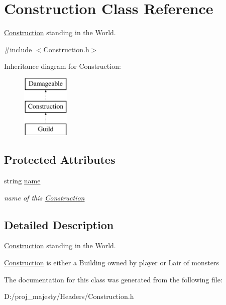\hypertarget{class_construction}{}\section{Construction Class Reference}
\label{class_construction}


\hyperlink{class_construction}{Construction} standing in the World.  




{\ttfamily \#include $<$Construction.\+h$>$}

Inheritance diagram for Construction\+:\begin{figure}[H]
\begin{center}
\leavevmode
\includegraphics[height=3.000000cm]{class_construction}
\end{center}
\end{figure}
\subsection*{Protected Attributes}
\begin{DoxyCompactItemize}
\item 
string \hyperlink{class_construction_a1c41965939bcc09f9c55a6bb8f15b82e}{name}\hypertarget{class_construction_a1c41965939bcc09f9c55a6bb8f15b82e}{}\label{class_construction_a1c41965939bcc09f9c55a6bb8f15b82e}

\begin{DoxyCompactList}\small\item\em name of this \hyperlink{class_construction}{Construction} \end{DoxyCompactList}\end{DoxyCompactItemize}


\subsection{Detailed Description}
\hyperlink{class_construction}{Construction} standing in the World. 

\hyperlink{class_construction}{Construction} is either a Building owned by player or Lair of monsters 

The documentation for this class was generated from the following file\+:\begin{DoxyCompactItemize}
\item 
D\+:/proj\+\_\+majesty/\+Headers/Construction.\+h\end{DoxyCompactItemize}
